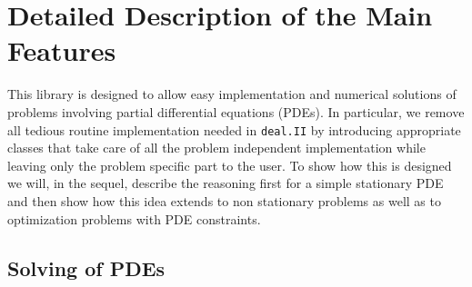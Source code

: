 \documentclass[prodmode,acmtoms]{acmsmall}
\numberwithin{equation}{section}
\newcommand{\deal}{\texttt{deal.II}}
\newcommand{\dope}{\texttt{DOpElib}}
\newcommand{\todo}[1]{\textbf{\textsc{\textcolor{black}{TODO: #1}}}}
\begin{document}
 



 
%
%
%



\section{Detailed Description of the Main Features}
\label{detailed_description}
This library is designed to allow easy implementation and numerical solutions 
of problems involving partial differential equations (PDEs). 
In particular, we remove all tedious routine implementation needed in 
\deal{} by introducing appropriate classes that take care of all the 
problem independent implementation while leaving only the problem specific 
part to the user. To show how this is designed we will, in the sequel, 
describe the reasoning first for a simple stationary PDE and then show
how this idea extends to non stationary problems as well as to optimization
problems with PDE constraints. 

\subsection{Solving of PDEs}
\end{document}
